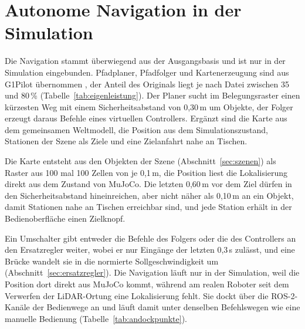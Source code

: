 \section{Autonome Navigation in der Simulation}
\label{sec:navigation}
Die Navigation stammt überwiegend aus der Ausgangsbasis und ist nur in der Simulation eingebunden.
Pfadplaner, Pfadfolger und Kartenerzeugung sind aus G1Pilot übernommen \cite{HucebotG1Pilot}, der Anteil des Originals liegt je nach Datei zwischen 35 und 80\,\% (Tabelle~\ref{tab:eigenleistung}).
Der Planer sucht im Belegungsraster einen kürzesten Weg mit einem Sicherheitsabstand von 0,30\,m um Objekte, der Folger erzeugt daraus Befehle eines virtuellen Controllers.
Ergänzt sind die Karte aus dem gemeinsamen Weltmodell, die Position aus dem Simulationszustand, Stationen der Szene als Ziele und eine Zielanfahrt nahe an Tischen.

Die Karte entsteht aus den Objekten der Szene (Abschnitt~\ref{sec:szenen}) als Raster aus 100 mal 100 Zellen von je 0,1\,m, die Position liest die Lokalisierung direkt aus dem Zustand von MuJoCo.
Die letzten 0,60\,m vor dem Ziel dürfen in den Sicherheitsabstand hineinreichen, aber nicht näher als 0,10\,m an ein Objekt, damit Stationen nahe an Tischen erreichbar sind, und jede Station erhält in der Bedienoberfläche einen Zielknopf.

Ein Umschalter gibt entweder die Befehle des Folgers oder die des Controllers an den Ersatzregler weiter, wobei er nur Eingänge der letzten 0,3\,s zulässt, und eine Brücke wandelt sie in die normierte Sollgeschwindigkeit um (Abschnitt~\ref{sec:ersatzregler}).
Die Navigation läuft nur in der Simulation, weil die Position dort direkt aus MuJoCo kommt, während am realen Roboter seit dem Verwerfen der LiDAR-Ortung eine Lokalisierung fehlt.
Sie dockt über die ROS-2-Kanäle der Bedienwege an und läuft damit unter denselben Befehlswegen wie eine manuelle Bedienung (Tabelle~\ref{tab:andockpunkte}).
